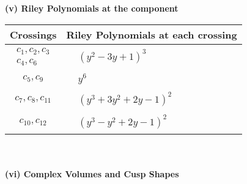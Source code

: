 \documentclass[1p]{elsarticle_modified}
\theoremstyle{definition}
\begin{document}
\newpage\renewcommand{\arraystretch}{1}
\flushleft \textbf{(v) Riley Polynomials at the component}\newline \\
\begin{tabular}{m{50pt}|m{274pt}}
Crossings & \hspace{64pt}Riley Polynomials at each crossing \\
\hline $$\begin{aligned}c_{1},c_{2},c_{3}\\c_{4},c_{6}\end{aligned}$$&$\begin{aligned}
&(y^2-3 y+1)^3
\end{aligned}$\\
\hline $$\begin{aligned}c_{5},c_{9}\end{aligned}$$&$\begin{aligned}
&y^6
\end{aligned}$\\
\hline $$\begin{aligned}c_{7},c_{8},c_{11}\end{aligned}$$&$\begin{aligned}
&(y^3+3 y^2+2 y-1)^2
\end{aligned}$\\
\hline $$\begin{aligned}c_{10},c_{12}\end{aligned}$$&$\begin{aligned}
&(y^3- y^2+2 y-1)^2
\end{aligned}$\\
\hline
\end{tabular}\\~\\
\newpage\flushleft \textbf{(vi) Complex Volumes and Cusp Shapes}
\end{document}
